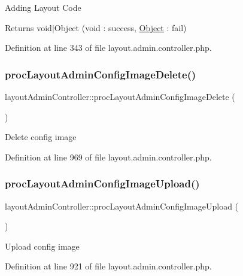 Adding Layout Code \begin{DoxyReturn}{Returns}
void$\vert$\+Object (void \+: success, \hyperlink{classObject}{Object} \+: fail) 
\end{DoxyReturn}


Definition at line 343 of file layout.\+admin.\+controller.\+php.

\hypertarget{classlayoutAdminController_ae6b9af868b9694fc6ad85c9496595d24}{}\label{classlayoutAdminController_ae6b9af868b9694fc6ad85c9496595d24} 
\subsubsection{\texorpdfstring{proc\+Layout\+Admin\+Config\+Image\+Delete()}{procLayoutAdminConfigImageDelete()}}
{\footnotesize\ttfamily layout\+Admin\+Controller\+::proc\+Layout\+Admin\+Config\+Image\+Delete (\begin{DoxyParamCaption}{ }\end{DoxyParamCaption})}

Delete config image 

Definition at line 969 of file layout.\+admin.\+controller.\+php.

\hypertarget{classlayoutAdminController_a24154a31e823e961c03d808257147700}{}\label{classlayoutAdminController_a24154a31e823e961c03d808257147700} 
\subsubsection{\texorpdfstring{proc\+Layout\+Admin\+Config\+Image\+Upload()}{procLayoutAdminConfigImageUpload()}}
{\footnotesize\ttfamily layout\+Admin\+Controller\+::proc\+Layout\+Admin\+Config\+Image\+Upload (\begin{DoxyParamCaption}{ }\end{DoxyParamCaption})}

Upload config image 

Definition at line 921 of file layout.\+admin.\+controller.\+php.

